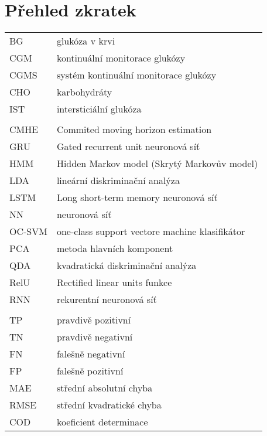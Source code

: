 \chapter*{Přehled zkratek}

\begin{tabular}{ll}
BG & glukóza v krvi\\
CGM & kontinuální monitorace glukózy\\
CGMS & systém kontinuální monitorace glukózy\\
CHO & karbohydráty\\
IST & intersticiální glukóza\\
\\
CMHE & Commited moving horizon estimation\\
GRU & Gated recurrent unit neuronová síť\\
HMM & Hidden Markov model (Skrytý Markovův model)\\
LDA & lineární diskriminační analýza\\
LSTM & Long short-term memory neuronová síť\\
NN & neuronová síť\\
OC-SVM & one-class support vectore machine klasifikátor\\
PCA & metoda hlavních komponent\\
QDA & kvadratická diskriminační analýza\\
RelU & Rectified linear units funkce\\
RNN & rekurentní neuronová síť\\
\\
TP & pravdivě pozitivní\\
TN & pravdivě negativní\\
FN & falešně negativní\\
FP & falešně pozitivní\\
MAE & střední absolutní chyba\\
RMSE & střední kvadratické chyba\\
COD & koeficient determinace
\end{tabular}
